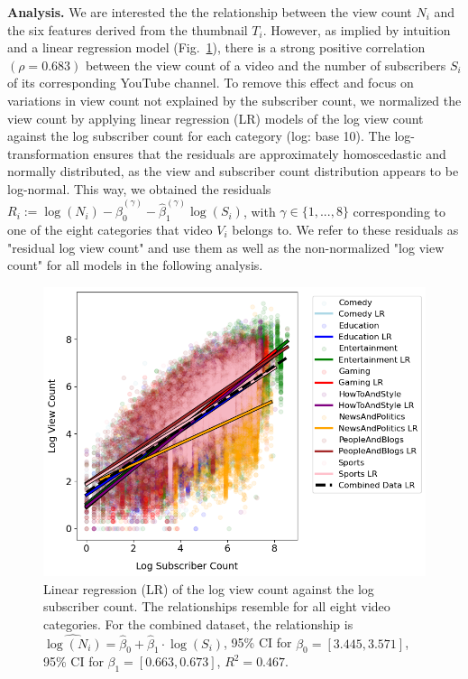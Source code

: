 \documentclass{article}
\begin{document}
\textbf{Analysis.} We are interested the the relationship between the view count $N_i$ and the six features derived from the thumbnail $T_i$. However, as implied by intuition and a linear regression model (Fig.~\ref{fig:subscriber}), there is a strong positive correlation $(\rho=0.683)$ between the view count of a video and the number of subscribers $S_i$ of its corresponding YouTube channel. To remove this effect and focus on variations in view count not explained by the subscriber count, we normalized the view count by applying linear regression (LR) models of the log view count against the log subscriber count for each category (log: base 10). The log-transformation ensures that the residuals are approximately homoscedastic and normally distributed, as the view and subscriber count distribution appears to be log-normal. This way, we obtained the residuals $R_{i} := \log(N_i) - \hat{\beta}_0^{(\gamma)} - \hat{\beta}_1^{(\gamma)} \log(S_i)$, with $\gamma \in \{1,..., 8\}$ corresponding to one of the eight categories that video $V_i$ belongs to. We refer to these residuals as "residual log view count" and use them as well as the non-normalized "log view count" for all models in the following analysis.


\begin{figure}[h]
  \begin{minipage}[t]{0.67\textwidth}
    \vspace{0pt}  %
    \includegraphics[width=\textwidth]{figs/subscriber.png}
  \end{minipage}%
  \hspace{0.05\textwidth}%
  \begin{minipage}[t]{0.27\textwidth}
    \vspace{0pt}  %
    \caption{Linear regression (LR) of the log view count against the log subscriber count. The relationships resemble for all eight video categories. For the combined dataset, the relationship is $\widehat{\log(N_i)} = \hat{\beta}_0 + \hat{\beta}_1 \cdot \log(S_i)$, 95\% CI for $\beta_0 = [3.445, 3.571]$, 95\% CI for $\beta_1 = [0.663, 0.673]$, $R^2 = 0.467$.}
    \label{fig:subscriber}
  \end{minipage}
\end{figure}
\end{document}
